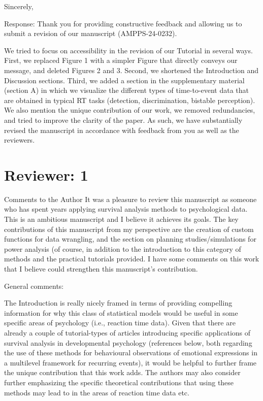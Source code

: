 \documentclass[
]{article}
\renewenvironment{quote}{\begin{leftbar}}{\end{leftbar}}
\begin{document}
\begin{quote}
Sincerely,
\end{quote}

Response: Thank you for providing constructive feedback and allowing us
to submit a revision of our manuscript (AMPPS-24-0232).

We tried to focus on accessibility in the revision of our Tutorial in
several ways. First, we replaced Figure 1 with a simpler Figure that
directly conveys our message, and deleted Figures 2 and 3. Second, we
shortened the Introduction and Discussion sections. Third, we added a
section in the supplementary material (section A) in which we visualize
the different types of time-to-event data that are obtained in typical
RT tasks (detection, discrimination, bistable perception). We also
mention the unique contribution of our work, we removed redundancies,
and tried to improve the clarity of the paper. As such, we have
substantially revised the manuscript in accordance with feedback from
you as well as the reviewers.

\section{Reviewer: 1}\label{reviewer-1}

\begin{quote}
Comments to the Author It was a pleasure to review this manuscript as
someone who has spent years applying survival analysis methods to
psychological data. This is an ambitious manuscript and I believe it
achieves its goals. The key contributions of this manuscript from my
perspective are the creation of custom functions for data wrangling, and
the section on planning studies/simulations for power analysis (of
course, in addition to the introduction to this category of methods and
the practical tutorials provided. I have some comments on this work that
I believe could strengthen this manuscript's contribution.
\end{quote}

\begin{quote}
General comments:
\end{quote}

\begin{quote}
The Introduction is really nicely framed in terms of providing
compelling information for why this class of statistical models would be
useful in some specific areas of psychology (i.e., reaction time data).
Given that there are already a couple of tutorial-types of articles
introducing specific applications of survival analysis in developmental
psychology (references below, both regarding the use of these methods
for behavioural observations of emotional expressions in a multilevel
framework for recurring events), it would be helpful to further frame
the unique contribution that this work adds. The authors may also
consider further emphasizing the specific theoretical contributions that
using these methods may lead to in the areas of reaction time data etc.
\end{quote}
\end{document}
